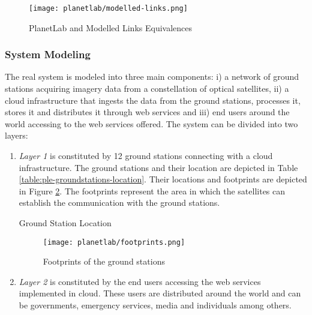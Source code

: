 \begin{figure}[!h]
\begin{center}
\texttt{[image: planetlab/modelled-links.png]}
\caption{PlanetLab and Modelled Links Equivalences}
\label{fig:ple-modelled-links}
\end{center}
\end{figure}


\subsubsection{System Modeling}

The real system is modeled into three main components: i) a network of ground stations acquiring imagery data from a constellation of optical satellites, ii) a cloud infrastructure that ingests the data from the ground stations, processes it, stores it and distributes it through web services and iii) end users around the world accessing to the web services offered. The system can be divided into two layers: 

\begin{enumerate}

\item \emph{Layer 1} is constituted by 12 ground stations connecting with a cloud
  infrastructure. The ground stations and their location are depicted in Table \ref{table:ple-groundstations-location}. Their locations and footprints are depicted in Figure \ref{fig:ple-footprints}. The footprints represent the area in which the satellites can establish the communication with the ground stations.

\begin{table}[hp]
  \centering
  {\small
  
  }
  \caption{Ground Station Location}
  \label{table:ple-groundstations-location}
\end{table}

\begin{figure}[!h]
\begin{center}
\texttt{[image: planetlab/footprints.png]}

\caption{Footprints of the ground stations}
\label{fig:ple-footprints}
\end{center}
\end{figure}


\item \emph{Layer 2} is constituted by the end users accessing the web services
  implemented in cloud. These users are distributed around the world and can be
  governments, emergency services, media and individuals among others.
\end{enumerate}

